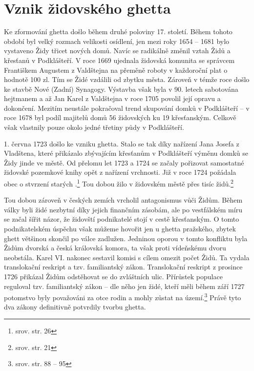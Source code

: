 \documentclass[a4paper,oneside,12pt]{report}
\begin{document}
\section{Vznik židovského ghetta}

Ke zformování ghetta došlo během druhé poloviny 17. století.
Během tohoto období byl velký rozmach velikosti osídlení, jen mezi roky 1654 -- 1681 bylo vystaveno Židy třicet nových domů.
Navíc se radikálně změnil vztah Židů a křesťanů v Podklášteří.
V roce 1669 ujednala židovská komunita se správcem Františkem Augustem z Valdštejna na přeměně roboty v každoroční plat o hodnotě 100 zl.
Tím se Židé vzdálili od zbytku města.
Zároveň v témže roce došlo ke stavbě Nové (Zadní) Synagogy.
Výstavba však byla v 90. letech sabotována hejtmanem a až Jan Karel z Valdštejna v roce 1705 povolil její opravu a dokončení.
Mezitím neustále pokračoval trend skupování domků v Podklášteří -- v roce 1678 byl podíl majitelů domů 56 židovských ku 19 křesťanským.
Celkově však vlastnily pouze okolo jedné třetiny půdy v Podklášteří.

1. června 1723 došlo ke vzniku ghetta.
Stalo se tak díky nařízení Jana Josefa z Vladštena, které přikázalo zbývajícím křesťanům v Podklášteří výměnu domků se Židy jinde ve městě.
Od přelomu let 1723 a 1724 se začaly pořizovat samostatné židovské pozemkové knihy opět z nařízení vrchnosti.
Již v roce 1724 požádala obec o stvrzení starých .\footnote{srov. \cite{Fiser2005} str. 26}
Tou dobou žilo v židovském městě přes tisíc židů.\footnote{srov.  str. 21}

Tou dobou zároveň v českých zemích vrcholil antagonismus vůči Židům.
Během války byli židé nezbytní díky jejich finančním zásobám, ale po vestfálském míru se začal šířit názor, že židovští podnikatelé stojí v cestě křesťanským.
O tomto podnikatelském úspěchu však můžeme hovořit jen u ghetta pražského, zbytek ghett většinou skončil po válce zadlužen.
Jedninou oporou v tomto konfliktu byla Židům dvorská a česká královská komora, ta však proti vídeňskému dvoru neobstála.
Karel VI. nakonec sestavil komisi s cílem omezit počet Židů.
Ta vydala translokační reskript a tzv. familiantský zákon.
Translokační reskript z prosince 1726 přikázal Židům odstěhovat se do zvláštních ulic.
Přírůstek populace reguloval tzv. familiantský zákon -- dle něho jen židé, kteří měli během září 1727 potomstvo byly považováni za otce rodin a mohly zůstat na území.\footnote{srov. \cite{Uhlir1978} str. 88 -- 95}
Právě tyto dva zákony definitivně potvrdily tvorbu ghetta.
\end{document}
